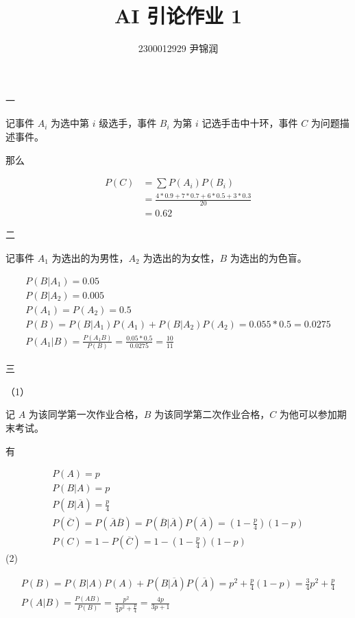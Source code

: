 \documentclass[UTF-8]{ctexart}
\title{AI 引论作业 1}
\author{2300012929 尹锦润}
\begin{document}
\maketitle

一

记事件 $\displaystyle A_{i}$ 为选中第 $\displaystyle i$ 级选手，事件 $\displaystyle B_{i}$ 为第 $\displaystyle i$ 记选手击中十环，事件 $\displaystyle C$ 为问题描述事件。

那么


\begin{equation*}
\begin{aligned}
P( C) & =\sum P( A_{i}) P( B_{i})\\
 & =\frac{4*0.9+7*0.7+6*0.5+3*0.3}{20}\\
 & =0.62
\end{aligned}
\end{equation*}


二



记事件 $\displaystyle A_{1}$ 为选出的为男性，$\displaystyle A_{2}$ 为选出的为女性，$\displaystyle B$ 为选出的为色盲。


\begin{gather*}
P( B|A_{1}) =0.05\\
P( B|A_{2}) =0.005\\
P( A_{1}) =P( A_{2}) =0.5\\
P( B) =P( B|A_{1}) P( A_{1}) +P( B|A_{2}) P( A_{2}) =0.055*0.5=0.0275\\
P( A_{1} |B) =\frac{P( A_{1} B)}{P( B)} =\frac{0.05*0.5}{0.0275} =\frac{10}{11}
\end{gather*}


三

（1）

记 $\displaystyle A$ 为该同学第一次作业合格，$\displaystyle B$ 为该同学第二次作业合格，$\displaystyle C$ 为他可以参加期末考试。

有


\begin{gather*}
P( A) =p\\
P( B|A) =p\\
P( B|\overline{A}) =\frac{p}{4}\\
P(\overline{C}) =P(\overline{A}\overline{B}) =P(\overline{B} |\overline{A}) P(\overline{A}) =\left( 1-\frac{p}{4}\right)( 1-p)\\
P( C) =1-P(\overline{C}) =1-\left( 1-\frac{p}{4}\right)( 1-p)
\end{gather*}
(2)


\begin{gather*}
P( B) =P( B|A) P( A) +P( B|\overline{A}) P(\overline{A}) =p^{2} +\frac{p}{4}( 1-p) =\frac{3}{4} p^{2} +\frac{p}{4}\\
P( A|B) =\frac{P( AB)}{P( B)} =\frac{p^{2}}{\frac{3}{4} p^{2} +\frac{p}{4}} =\frac{4p}{3p+1}
\end{gather*}
\end{document}
